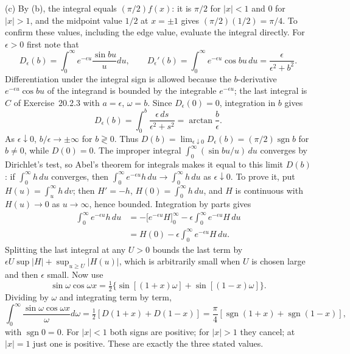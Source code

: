 (c) By (b), the integral equals $(\pi/2)f(x)$: it is $\pi/2$ for
$|x|<1$ and $0$ for $|x|>1$, and the midpoint value $1/2$ at
$x=\pm1$ gives $(\pi/2)(1/2)=\pi/4$. To confirm these values,
including the edge value, evaluate the integral directly. For
$\epsilon>0$ first note that
\[
D_\epsilon(b)=\int_0^\infty e^{-\epsilon u}\frac{\sin bu}{u}du,
\qquad D_\epsilon'(b)=\int_0^\infty e^{-\epsilon u}\cos bu\,du
=\frac{\epsilon}{\epsilon^2+b^2}.
\]
Differentiation under the integral sign is allowed because the
$b$-derivative $e^{-\epsilon u}\cos bu$ of the integrand is bounded
by the integrable $e^{-\epsilon u}$; the last integral is $C$ of
Exercise~20.2.3 with $a=\epsilon$, $\omega=b$.
Since $D_\epsilon(0)=0$, integration in $b$ gives
\[
D_\epsilon(b)=\int_0^b\frac{\epsilon\,ds}{\epsilon^2+s^2}
=\arctan\frac b\epsilon.
\]
As $\epsilon\downarrow0$, $b/\epsilon\to\pm\infty$ for $b\gtrless0$.
Thus $D(b)=\lim_{\epsilon\downarrow0}D_\epsilon(b)
=(\pi/2)\operatorname{sgn}b$ for $b\ne0$, while
$D(0)=0$. The improper integral
$\int_0^\infty(\sin bu/u)\,du$ converges by Dirichlet's test, so
Abel's theorem for integrals makes it equal to this limit $D(b)$:
if $\int_0^\infty h\,du$ converges, then
$\int_0^\infty e^{-\epsilon u}h\,du\to\int_0^\infty h\,du$ as
$\epsilon\downarrow0$. To prove it, put $H(u)=\int_u^\infty h\,dv$;
then $H'=-h$, $H(0)=\int_0^\infty h\,du$, and $H$ is continuous with
$H(u)\to0$ as $u\to\infty$, hence bounded. Integration by parts gives
\begin{align*}
\int_0^\infty e^{-\epsilon u}h\,du
&=-\bigl[e^{-\epsilon u}H\bigr]_0^\infty
-\epsilon\int_0^\infty e^{-\epsilon u}H\,du\\
&=H(0)-\epsilon\int_0^\infty e^{-\epsilon u}H\,du.
\end{align*}
Splitting the last integral at any $U>0$ bounds the last term by
$\epsilon U\sup|H|+\sup_{u\ge U}|H(u)|$, which is arbitrarily small
when $U$ is chosen large and then $\epsilon$ small. Now use
\[
\sin\omega\cos\omega x
=\tfrac12\{\sin[(1+x)\omega]+\sin[(1-x)\omega]\}.
\]
Dividing by $\omega$ and integrating term by term,
\[
\int_0^\infty\frac{\sin\omega\cos\omega x}{\omega}d\omega
=\tfrac12[D(1+x)+D(1-x)]
=\frac\pi4[\operatorname{sgn}(1+x)+\operatorname{sgn}(1-x)],
\]
with $\operatorname{sgn}0=0$. For $|x|<1$ both signs are
positive; for $|x|>1$ they cancel; at $|x|=1$ just one is
positive. These are exactly the three stated values.

